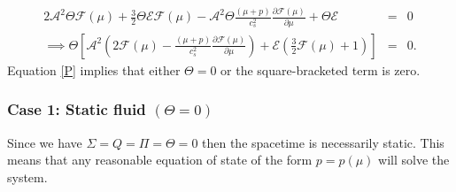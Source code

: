\documentclass[abstract=on,notitlepage,superscriptaddress,nofootinbib,aps,preprint,prd]{revtex4}
\newcommand{\0}{^{(0)}}
\newcommand{\1}{^{(1)}}
\newcommand{\2}{^{(2)}}
\newcommand{\3}{{}^{(3)}}
\begin{document}
\begin{eqnarray}
	2\mathcal{A}^2\Theta\mathcal{F}(\mu)+\frac{3}{2}\Theta\mathcal{E}\mathcal{F}(\mu)-\mathcal{A}^2\Theta\frac{(\mu+p)}{c_s^2}\frac{\partial \mathcal{F}(\mu)}{\partial \mu}+\Theta\mathcal{E} &=&0 \nonumber \\
	\implies \Theta\left[\mathcal{A}^2\left(2\mathcal{F}(\mu)-\frac{(\mu+p)}{c_s^2}\frac{\partial \mathcal{F}(\mu)}{\partial \mu}\right)+\mathcal{E}\left(\frac{3}{2}\mathcal{F}(\mu)+1\right)\right]&=&0. \label{P}
\end{eqnarray}
Equation \eqref{P} implies that either $\Theta = 0$ or the square-bracketed term is zero.


\subsubsection{Case 1: Static fluid $\left(\Theta = 0\right)$}
Since we have $\Sigma = Q =\Pi=\Theta = 0$ then the spacetime is necessarily static. This means that any reasonable equation of state of the form $p=p(\mu)$ will solve the system.

\end{document}
